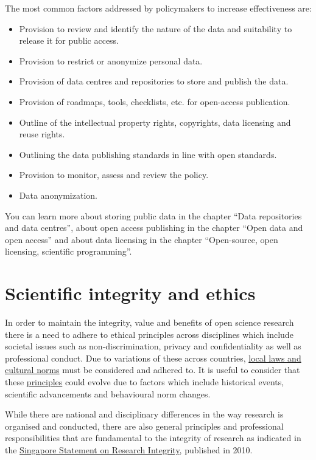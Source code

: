 \documentclass[
]{book}
\begin{document}
The most common factors addressed by policymakers to increase effectiveness are:

\begin{itemize}
\item
  Provision to review and identify the nature of the data and suitability to release it for public access.
\item
  Provision to restrict or anonymize personal data.
\item
  Provision of data centres and repositories to store and publish the data.
\item
  Provision of roadmaps, tools, checklists, etc. for open-access publication.
\item
  Outline of the intellectual property rights, copyrights, data licensing and reuse rights.
\item
  Outlining the data publishing standards in line with open standards.
\item
  Provision to monitor, assess and review the policy.
\item
  Data anonymization.
\end{itemize}

You can learn more about storing public data in the chapter ``Data repositories and data centres'', about open access publishing in the chapter ``Open data and open access'' and about data licensing in the chapter ``Open-source, open licensing, scientific programming''.

\hypertarget{scientific-integrity-and-ethics}{%
\section{Scientific integrity and ethics}\label{scientific-integrity-and-ethics}}

In order to maintain the integrity, value and benefits of open science research there is a need to adhere to ethical principles across disciplines which include societal issues such as non-discrimination, privacy and confidentiality as well as professional conduct. Due to variations of these across countries, \href{https://www.rand.org/}{local laws and cultural norms} must be considered and adhered to. It is useful to consider that these \href{https://the-turing-way.netlify.app/ethical-research/ethical-research.html}{principles} could evolve due to factors which include historical events, scientific advancements and behavioural norm changes.

While there are national and disciplinary differences in the way research is organised and conducted, there are also general principles and professional responsibilities that are fundamental to the integrity of research as indicated in the \href{https://wcrif.org/statement}{Singapore Statement on Research Integrity}, published in 2010.
\end{document}
